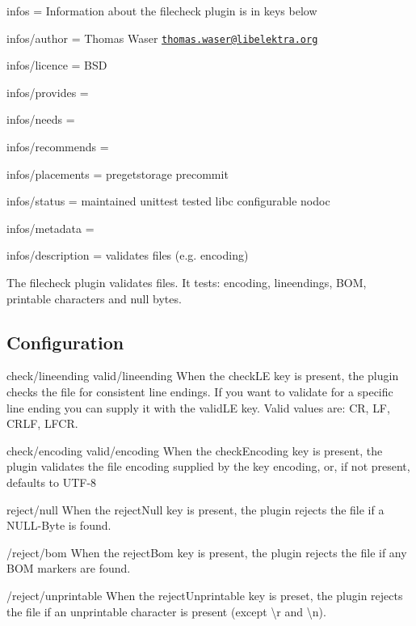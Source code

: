 
\begin{DoxyItemize}
\item infos = Information about the filecheck plugin is in keys below
\item infos/author = Thomas Waser \href{mailto:thomas.waser@libelektra.org}{\tt thomas.\+waser@libelektra.\+org}
\item infos/licence = B\+SD
\item infos/provides =
\item infos/needs =
\item infos/recommends =
\item infos/placements = pregetstorage precommit
\item infos/status = maintained unittest tested libc configurable nodoc
\item infos/metadata =
\item infos/description = validates files (e.\+g. encoding)
\end{DoxyItemize}

The filecheck plugin validates files. It tests\+: encoding, lineendings, B\+OM, printable characters and null bytes.

\subsection*{Configuration}

{\ttfamily check/lineending} {\ttfamily valid/lineending} When the {\ttfamily check\+LE} key is present, the plugin checks the file for consistent line endings. If you want to validate for a specific line ending you can supply it with the {\ttfamily valid\+LE} key. Valid values are\+: {\ttfamily CR}, {\ttfamily LF}, {\ttfamily C\+R\+LF}, {\ttfamily L\+F\+CR}.

{\ttfamily check/encoding} {\ttfamily valid/encoding} When the {\ttfamily check\+Encoding} key is present, the plugin validates the file encoding supplied by the key {\ttfamily encoding}, or, if not present, defaults to {\ttfamily U\+T\+F-\/8}

{\ttfamily reject/null} When the {\ttfamily reject\+Null} key is present, the plugin rejects the file if a N\+U\+L\+L-\/\+Byte is found.

{\ttfamily /reject/bom} When the {\ttfamily reject\+Bom} key is present, the plugin rejects the file if any B\+OM markers are found.

{\ttfamily /reject/unprintable} When the {\ttfamily reject\+Unprintable} key is preset, the plugin rejects the file if an unprintable character is present (except {\ttfamily \textbackslash{}r} and {\ttfamily \textbackslash{}n}). 